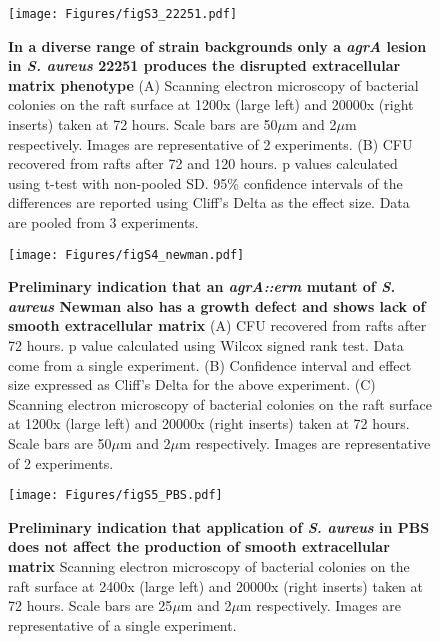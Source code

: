 \documentclass[10pt,letterpaper]{article}
\begin{document}
\begin{figure}[H]
\begin{adjustwidth}{-2.25in}{0in}
\texttt{[image: Figures/figS3\_22251.pdf]}
\caption[In a diverse range of strain backgrounds only a \textit{agrA} lesion in \textit{S. aureus} 22251 produces the disrupted extracellular matrix phenotype]{
	\textbf{In a diverse range of strain backgrounds only a \textit{agrA} lesion in \textit{S. aureus} 22251 produces the disrupted extracellular matrix phenotype}
	(A) Scanning electron microscopy of bacterial colonies on the raft surface at 1200x (large left) and 20000x (right inserts) taken at 72 hours. Scale bars are 50$\mu$m and 2$\mu$m respectively. Images are representative of 2 experiments.
	(B) CFU recovered from rafts after 72 and 120 hours. p values calculated using t-test with non-pooled SD. 95\% confidence intervals of the differences are reported using Cliff's Delta as the effect size. Data are pooled from 3 experiments.}
        \label{figS3}
        \end{adjustwidth}
\end{figure}

\begin{figure}[H]
\begin{adjustwidth}{-2.25in}{0in}
\texttt{[image: Figures/figS4\_newman.pdf]}
\caption[Preliminary indication that an \textit{agrA::erm} mutant of \textit{S. aureus} Newman also has a growth defect and shows lack of smooth extracellular matrix]{
\textbf{Preliminary indication that an \textit{agrA::erm} mutant of \textit{S. aureus} Newman also has a growth defect and shows lack of smooth extracellular matrix}
	(A) CFU recovered from rafts after 72 hours. p value calculated using Wilcox signed rank test. Data come from a single experiment.
	(B) Confidence interval and effect size expressed as Cliff's Delta for the above experiment.
	(C) Scanning electron microscopy of bacterial colonies on the raft surface at 1200x (large left) and 20000x (right inserts) taken at 72 hours. Scale bars are 50$\mu$m and 2$\mu$m respectively. Images are representative of 2 experiments.}
        \label{figS4}
        \end{adjustwidth}
\end{figure}

\begin{figure}[H]
\begin{adjustwidth}{-2.25in}{0in}
\texttt{[image: Figures/figS5\_PBS.pdf]}
\caption[Preliminary indication that application of \textit{S. aureus} in PBS does not affect the production of smooth extracellular matrix]{
\textbf{Preliminary indication that application of \textit{S. aureus} in PBS does not affect the production of smooth extracellular matrix}
Scanning electron microscopy of bacterial colonies on the raft surface at 2400x (large left) and 20000x (right inserts) taken at 72 hours. Scale bars are 25$\mu$m and 2$\mu$m respectively. Images are representative of a single experiment.}
    \label{figS5}
    \end{adjustwidth}
\end{figure}
\end{document}
